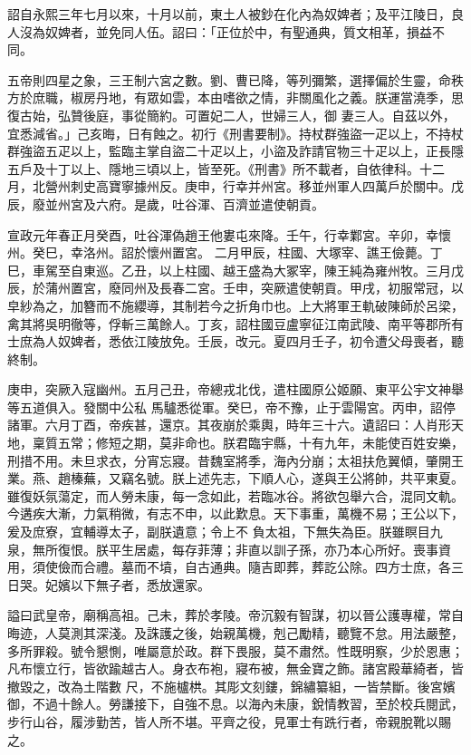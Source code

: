 \begin{pinyinscope}
 詔自永熙三年七月以來，十月以前，東土人被鈔在化內為奴婢者；及平江陵日，良人沒為奴婢者，並免同人伍。詔曰：「正位於中，有聖通典，質文相革，損益不同。



 五帝則四星之象，三王制六宮之數。劉、曹已降，等列彌繁，選擇偏於生靈，命秩方於庶職，椒房丹地，有眾如雲，本由嗜欲之情，非關風化之義。朕運當澆季，思復古始，弘贊後庭，事從簡約。可置妃二人，世婦三人，御
 妻三人。自茲以外，宜悉減省。」己亥晦，日有蝕之。初行《刑書要制》。持杖群強盜一疋以上，不持杖群強盜五疋以上，監臨主掌自盜二十疋以上，小盜及詐請官物三十疋以上，正長隱五戶及十丁以上、隱地三頃以上，皆至死。《刑書》所不載者，自依律科。十二月，北營州刺史高寶寧據州反。庚申，行幸并州宮。移並州軍人四萬戶於關中。戊辰，廢並州宮及六府。是歲，吐谷渾、百濟並遣使朝貢。



 宣政元年春正月癸酉，吐谷渾偽趙王他婁屯來降。壬午，行幸鄴宮。辛卯，幸懷州。癸巳，幸洛州。詔於懷州置宮。
 二月甲辰，柱國、大塚宰、譙王儉薨。丁巳，車駕至自東巡。乙丑，以上柱國、越王盛為大冢宰，陳王純為雍州牧。三月戊辰，於蒲州置宮，廢同州及長春二宮。壬申，突厥遣使朝貢。甲戌，初服常冠，以皁紗為之，加簪而不施纓導，其制若今之折角巾也。上大將軍王軌破陳師於呂梁，禽其將吳明徹等，俘斬三萬餘人。丁亥，詔柱國豆盧寧征江南武陵、南平等郡所有士庶為人奴婢者，悉依江陵放免。壬辰，改元。夏四月壬子，初令遭父母喪者，聽終制。



 庚申，突厥入寇幽州。五月己丑，帝總戎北伐，遣柱國原公姬願、東平公宇文神舉等五道俱入。發關中公私
 馬驢悉從軍。癸巳，帝不豫，止于雲陽宮。丙申，詔停諸軍。六月丁酉，帝疾甚，還京。其夜崩於乘輿，時年三十六。遺詔曰：人肖形天地，稟質五常；修短之期，莫非命也。朕君臨宇縣，十有九年，未能使百姓安樂，刑措不用。未旦求衣，分宵忘寢。昔魏室將季，海內分崩；太祖扶危翼傾，肇開王業。燕、趙榛蕪，又竊名號。朕上述先志，下順人心，遂與王公將帥，共平東夏。雖復妖氛蕩定，而人勞未康，每一念如此，若臨冰谷。將欲包舉六合，混同文軌。今遘疾大漸，力氣稍微，有志不申，以此歎息。天下事重，萬機不易；王公以下，爰及庶寮，宜輔導太子，副朕遺意；令上不
 負太祖，下無失為臣。朕雖瞑目九泉，無所復恨。朕平生居處，每存菲薄；非直以訓子孫，亦乃本心所好。喪事資用，須使儉而合禮。墓而不墳，自古通典。隨吉即葬，葬訖公除。四方士庶，各三日哭。妃嬪以下無子者，悉放還家。



 謚曰武皇帝，廟稱高祖。己未，葬於孝陵。帝沉毅有智謀，初以晉公護專權，常自晦迹，人莫測其深淺。及誅護之後，始親萬機，剋己勵精，聽覽不怠。用法嚴整，多所罪殺。號令懇惻，唯屬意於政。群下畏服，莫不肅然。性既明察，少於恩惠；凡布懷立行，皆欲踰越古人。身衣布袍，寢布被，無金寶之飾。諸宮殿華綺者，皆撤毀之，改為土階數
 尺，不施櫨栱。其彫文刻鏤，錦繡纂組，一皆禁斷。後宮嬪御，不過十餘人。勞謙接下，自強不息。以海內未康，銳情教習，至於校兵閱武，步行山谷，履涉勤苦，皆人所不堪。平齊之役，見軍士有跣行者，帝親脫靴以賜之。




\end{pinyinscope}
